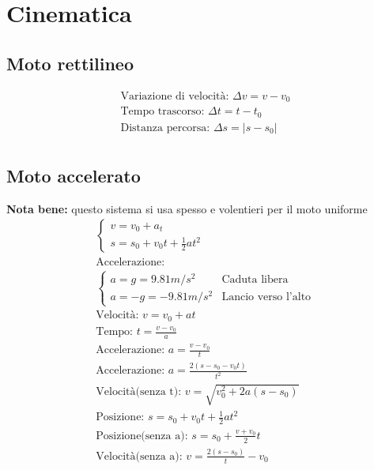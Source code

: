 \section{Cinematica}
\subsection{Moto rettilineo}
\begin{gather*}
\text{Variazione di velocità: } \Delta v = v - v_0 \\
\text{Tempo trascorso: } \Delta t = t - t_0 \\
\text{Distanza percorsa: } \Delta s = \left| s - s_0 \right| \\
\end{gather*}
\subsection{Moto accelerato}
\textbf{Nota bene: } questo sistema si usa spesso e volentieri per il moto uniforme
\begin{gather*}
\begin{cases}
    v = v_0 + a_t \\
    s = s_0 + v_0 t + \frac{1}{2} a t^2
\end{cases}
\\
\text{Accelerazione:} \\
\begin{cases}
 a = g = 9.81 m/s^2 & \text{Caduta libera} \\
 a = -g = - 9.81m/s^2 & \text{Lancio verso l'alto}
\end{cases}
\\
\text{Velocità: } v = v_0 + a t \\
\text{Tempo: } t = \frac{v - v_0}{a} \\
\text{Accelerazione: } a = \frac{v - v_0}{t} \\
\text{Accelerazione: } a = \frac{2 (s - s_0 - v_0 t)}{t^2} \\
\text{Velocità(senza t): } v = \sqrt{v_0^2 + 2 a (s - s_0)} \\
\text{Posizione: } s = s_0 + v_0 t + \frac{1}{2} a t^2 \\
\text{Posizione(senza a): } s = s_0 + \frac{v + v_0}{2} t \\
\text{Velocità(senza a): } v = \frac{2 (s - s_0)}{t} - v_0
\end{gather*}

